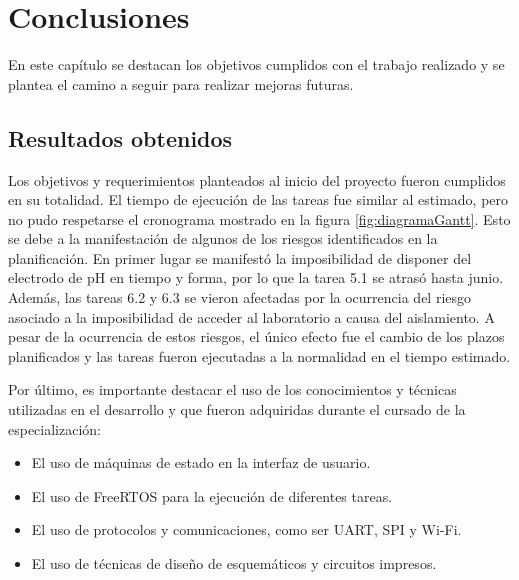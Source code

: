 
\chapter{Conclusiones} %

\label{Chapter5} %



En este capítulo se destacan los objetivos cumplidos con el trabajo realizado y se plantea el camino a seguir para realizar mejoras futuras.


\section{Resultados obtenidos }

Los objetivos y requerimientos planteados al inicio del proyecto fueron cumplidos en su totalidad. El tiempo de ejecución de las tareas fue similar al estimado, pero no pudo respetarse el cronograma mostrado en la figura \ref{fig:diagramaGantt}. Esto se debe a la manifestación de algunos de los riesgos identificados en la planificación. En primer lugar se manifestó la imposibilidad de disponer del electrodo de pH en tiempo y forma, por lo que la tarea 5.1 se atrasó hasta junio. Además, las tareas 6.2 y 6.3 se vieron afectadas por la ocurrencia del riesgo asociado a la imposibilidad de acceder al laboratorio a causa del aislamiento. A pesar de la ocurrencia de estos riesgos, el único efecto fue el cambio de los plazos planificados y las tareas fueron ejecutadas a la normalidad en el tiempo estimado.

Por último, es importante destacar el uso de los conocimientos y técnicas utilizadas en el desarrollo y que fueron adquiridas durante el cursado de la especialización:
\begin{itemize}
 \item El uso de máquinas de estado en la interfaz de usuario.
 \item El uso de FreeRTOS para la ejecución de diferentes tareas.
 \item El uso de protocolos y comunicaciones, como ser UART, SPI y Wi-Fi.
 \item El uso de técnicas de diseño de esquemáticos y circuitos impresos.
\end{itemize}

